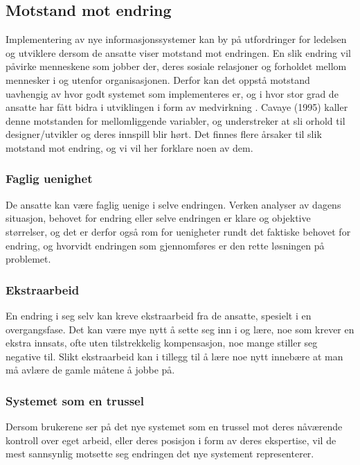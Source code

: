 \subsection{Motstand mot endring}
\label{chp: motstand}

Implementering av nye informasjonssystemer kan by på utfordringer for ledelsen og utviklere dersom de ansatte viser motstand mot endringen. 
En slik endring vil påvirke menneskene som jobber der, deres sosiale relasjoner og forholdet mellom mennesker i og utenfor organisasjonen. Derfor kan det oppstå motstand uavhengig av hvor godt systemet som implementeres er, og i hvor stor grad de ansatte har fått bidra i utviklingen i form av medvirkning \cite{Jacobsen12}. Cavaye (1995) kaller denne motstanden for mellomliggende variabler, og understreker at sli
orhold til designer/utvikler og deres innspill blir hørt. Det finnes flere årsaker til slik motstand mot endring, og vi vil her forklare noen av dem. 

\subsubsection{Faglig uenighet}
De ansatte kan være faglig uenige i selve endringen. Verken analyser av dagens situasjon, behovet for endring eller selve endringen er klare og objektive størrelser, og det er derfor også rom for uenigheter rundt det faktiske behovet for endring, og hvorvidt endringen som gjennomføres er den rette løsningen på problemet. \cite{Jacobsen12}

\subsubsection{Ekstraarbeid}
En endring i seg selv kan kreve ekstraarbeid fra de ansatte, spesielt i en overgangsfase. Det kan være mye nytt å sette seg inn i og lære, noe som krever en ekstra innsats, ofte uten tilstrekkelig kompensasjon, noe mange stiller seg negative til. Slikt ekstraarbeid kan i tillegg til å lære noe nytt innebære at man må avlære de gamle måtene å jobbe på. \cite{Jacobsen12}

\subsubsection{Systemet som en trussel}
Dersom brukerene ser på det nye systemet som en trussel mot deres nåværende kontroll over eget arbeid, eller deres posisjon i form av deres ekspertise, vil de mest sannsynlig motsette seg endringen det nye systement representerer. \cite{Cavaye95}

